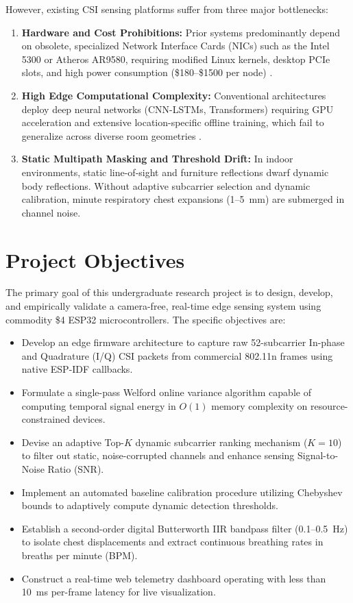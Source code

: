 However, existing CSI sensing platforms suffer from three major bottlenecks:
\begin{enumerate}
    \item \textbf{Hardware and Cost Prohibitions:} Prior systems predominantly depend on obsolete, specialized Network Interface Cards (NICs) such as the Intel 5300 or Atheros AR9580, requiring modified Linux kernels, desktop PCIe slots, and high power consumption (\$180--\$1500 per node) \cite{halperin2011tool, zeng2019farsense}.
    \item \textbf{High Edge Computational Complexity:} Conventional architectures deploy deep neural networks (CNN-LSTMs, Transformers) requiring GPU acceleration and extensive location-specific offline training, which fail to generalize across diverse room geometries \cite{wang2019csinet}.
    \item \textbf{Static Multipath Masking and Threshold Drift:} In indoor environments, static line-of-sight and furniture reflections dwarf dynamic body reflections. Without adaptive subcarrier selection and dynamic calibration, minute respiratory chest expansions (1--5~mm) are submerged in channel noise.
\end{enumerate}

\section{Project Objectives}
The primary goal of this undergraduate research project is to design, develop, and empirically validate a camera-free, real-time edge sensing system using commodity \$4 ESP32 microcontrollers. The specific objectives are:
\begin{itemize}
    \item Develop an edge firmware architecture to capture raw 52-subcarrier In-phase and Quadrature (I/Q) CSI packets from commercial 802.11n frames using native ESP-IDF callbacks.
    \item Formulate a single-pass Welford online variance algorithm capable of computing temporal signal energy in $O(1)$ memory complexity on resource-constrained devices.
    \item Devise an adaptive Top-$K$ dynamic subcarrier ranking mechanism ($K=10$) to filter out static, noise-corrupted channels and enhance sensing Signal-to-Noise Ratio (SNR).
    \item Implement an automated baseline calibration procedure utilizing Chebyshev bounds to adaptively compute dynamic detection thresholds.
    \item Establish a second-order digital Butterworth IIR bandpass filter (0.1--0.5~Hz) to isolate chest displacements and extract continuous breathing rates in breaths per minute (BPM).
    \item Construct a real-time web telemetry dashboard operating with less than 10~ms per-frame latency for live visualization.
\end{itemize}


